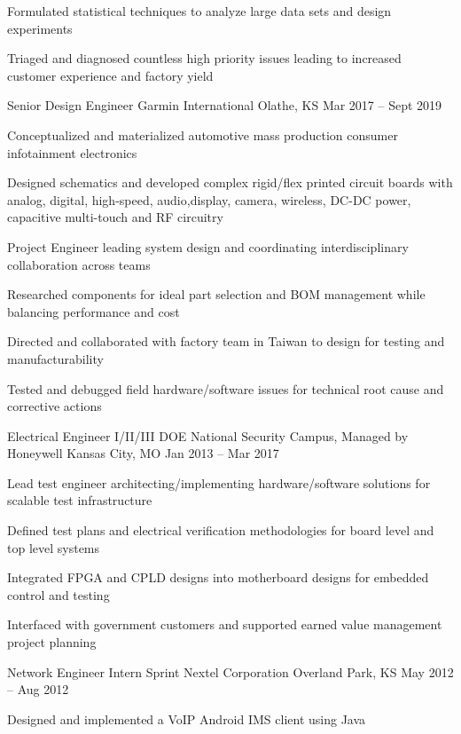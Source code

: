 \documentclass[]{awesome-cv}
\begin{document}
\begin{cventries}
{\begin{cvitems}
		\item {Formulated statistical techniques to analyze large data sets and design experiments}
		\item {Triaged and diagnosed countless high priority issues leading to increased customer experience and factory yield}
	\end{cvitems}}
	\cventry
	{Senior Design Engineer}
	{Garmin International}
	{Olathe, KS}
	{Mar 2017 – Sept 2019}
	{\begin{cvitems}
		\item {Conceptualized and materialized automotive mass production consumer infotainment electronics}
		\item {Designed schematics and developed complex rigid/flex printed circuit boards with analog, digital, high-speed, audio,\hfill \break  display, camera, wireless, DC-DC power, capacitive multi-touch and RF circuitry}
		\item {Project Engineer leading system design and coordinating interdisciplinary collaboration across teams}
		\item {Researched components for ideal part selection and BOM management while balancing performance and cost}
		\item {Directed and collaborated with factory team in Taiwan to design for testing and manufacturability}
		\item {Tested and debugged field hardware/software issues for technical root cause and corrective actions}
		\end{cvitems}}
	\cventry
	{Electrical Engineer I/II/III}
	{DOE National Security Campus, Managed by Honeywell}
	{Kansas City, MO}
	{Jan 2013 – Mar 2017}
	{\begin{cvitems}
		\item {Lead test engineer architecting/implementing hardware/software solutions for scalable test infrastructure}
		\item {Defined test plans and electrical verification methodologies for board level and top level systems}
		\item {Integrated FPGA and CPLD designs into motherboard designs for embedded control and testing}
		\item {Interfaced with government customers and supported earned value management project planning}
		\end{cvitems}}
	\cventry
	{Network Engineer Intern}
	{Sprint Nextel Corporation}
	{Overland Park, KS}
	{May 2012 – Aug 2012}
	{\begin{cvitems}
		\item {Designed and implemented a VoIP Android IMS client using Java}

\end{cvitems}}
\end{cventries}
\end{document}
